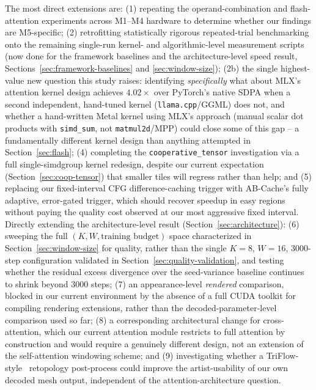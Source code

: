 \documentclass[11pt]{article}
\newcommand{\code}[1]{\texttt{#1}}
\begin{document}
The most direct extensions are: (1) repeating the operand-combination and flash-attention
experiments across M1--M4 hardware to determine whether our findings are M5-specific; (2)
retrofitting statistically rigorous repeated-trial benchmarking onto the remaining single-run
kernel- and algorithmic-level measurement scripts (now done for the framework baselines and the
architecture-level speed result, Sections~\ref{sec:framework-baselines} and
\ref{sec:window-size}); (2b) the single highest-value new question this study raises: identifying
\emph{specifically} what about MLX's attention kernel design achieves $4.02\times$ over PyTorch's
native SDPA when a second independent, hand-tuned kernel (\code{llama.cpp}/GGML) does not, and
whether a hand-written Metal kernel using MLX's approach (manual scalar dot products with
\code{simd\_sum}, not \code{matmul2d}/MPP) could close some of this gap -- a fundamentally
different kernel design than anything attempted in Section~\ref{sec:flash}; (4) completing the
\code{cooperative\_tensor} investigation via
a full single-simdgroup kernel redesign, despite our current expectation (Section~\ref{sec:coop-tensor})
that smaller tiles will regress rather than help; and (5) replacing our fixed-interval CFG
difference-caching trigger with AB-Cache's fully adaptive, error-gated trigger, which should
recover speedup in easy regions without paying the quality cost observed at our most aggressive
fixed interval. Directly extending the architecture-level result (Section~\ref{sec:architecture}):
(6) sweeping the full $(K, W, \text{training budget})$ space characterized in
Section~\ref{sec:window-size} for quality, rather than the single $K{=}8$, $W{=}16$, 3000-step
configuration validated in Section~\ref{sec:quality-validation}, and testing whether the residual
excess divergence over the seed-variance baseline continues to shrink beyond 3000 steps; (7) an
appearance-level \emph{rendered} comparison, blocked in our current environment by the absence of
a full CUDA toolkit for compiling rendering extensions, rather than the decoded-parameter-level
comparison used so far; (8) a corresponding architectural change for cross-attention, which our
current attention module restricts to full attention by construction and would require a
genuinely different design, not an extension of the self-attention windowing scheme; and (9)
investigating whether a TriFlow-style~\cite{triflow} retopology post-process could improve the
artist-usability of our own decoded mesh output, independent of the attention-architecture
question.
\end{document}
